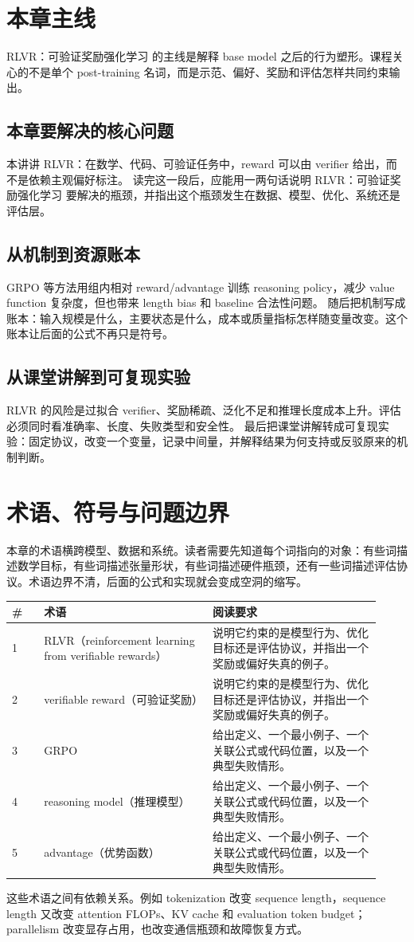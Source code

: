 \documentclass[a4paper]{article}
\begin{document}
\section{本章主线}
RLVR：可验证奖励强化学习 的主线是解释 base model 之后的行为塑形。课程关心的不是单个 post-training 名词，而是示范、偏好、奖励和评估怎样共同约束输出。
\subsection{本章要解决的核心问题}
本讲讲 RLVR：在数学、代码、可验证任务中，reward 可以由 verifier 给出，而不是依赖主观偏好标注。
读完这一段后，应能用一两句话说明 RLVR：可验证奖励强化学习 要解决的瓶颈，并指出这个瓶颈发生在数据、模型、优化、系统还是评估层。
\subsection{从机制到资源账本}
GRPO 等方法用组内相对 reward/advantage 训练 reasoning policy，减少 value function 复杂度，但也带来 length bias 和 baseline 合法性问题。
随后把机制写成账本：输入规模是什么，主要状态是什么，成本或质量指标怎样随变量改变。这个账本让后面的公式不再只是符号。
\subsection{从课堂讲解到可复现实验}
RLVR 的风险是过拟合 verifier、奖励稀疏、泛化不足和推理长度成本上升。评估必须同时看准确率、长度、失败类型和安全性。
最后把课堂讲解转成可复现实验：固定协议，改变一个变量，记录中间量，并解释结果为何支持或反驳原来的机制判断。
\section{术语、符号与问题边界}
本章的术语横跨模型、数据和系统。读者需要先知道每个词指向的对象：有些词描述数学目标，有些词描述张量形状，有些词描述硬件瓶颈，还有一些词描述评估协议。术语边界不清，后面的公式和实现就会变成空洞的缩写。
\begin{longtable}{p{0.08\linewidth}p{0.42\linewidth}p{0.42\linewidth}}
\toprule
\textbf{\#} & \textbf{术语} & \textbf{阅读要求}\\
\midrule
1 & RLVR（reinforcement learning from verifiable rewards） & 说明它约束的是模型行为、优化目标还是评估协议，并指出一个奖励或偏好失真的例子。\\
2 & verifiable reward（可验证奖励） & 说明它约束的是模型行为、优化目标还是评估协议，并指出一个奖励或偏好失真的例子。\\
3 & GRPO & 给出定义、一个最小例子、一个关联公式或代码位置，以及一个典型失败情形。\\
4 & reasoning model（推理模型） & 给出定义、一个最小例子、一个关联公式或代码位置，以及一个典型失败情形。\\
5 & advantage（优势函数） & 给出定义、一个最小例子、一个关联公式或代码位置，以及一个典型失败情形。\\
\bottomrule
\end{longtable}
这些术语之间有依赖关系。例如 tokenization 改变 sequence length，sequence length 又改变 attention FLOPs、KV cache 和 evaluation token budget；parallelism 改变显存占用，也改变通信瓶颈和故障恢复方式。
\end{document}
